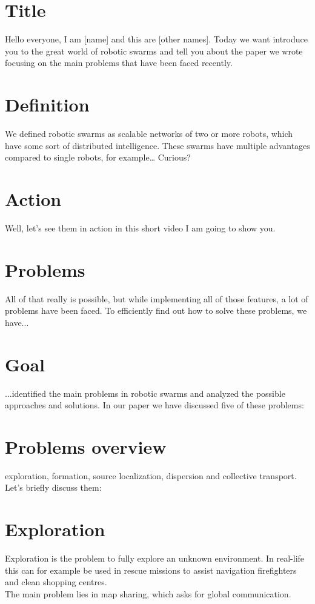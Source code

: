 \documentclass[a4paper]{article}
\begin{document}
\section*{Title}
Hello everyone, I am [name] and this are [other names]. Today we want introduce you to the great world of robotic swarms and tell you about the paper we wrote focusing on the main problems that have been faced recently.

\section*{Definition}
We defined robotic swarms as scalable networks of two or more robots, which have some sort of distributed intelligence. These swarms have multiple advantages compared to single robots, for example… Curious?

\section*{Action}
Well, let’s see them in action in this short video I am going to show you.

\section*{Problems}
All of that really is possible, but while implementing all of those features, a lot of problems have been faced. To efficiently find out how to solve these problems, we have...

\section*{Goal}
...identified the main problems in robotic swarms and analyzed the possible approaches and solutions. In our paper we have discussed five of these problems: 

\section*{Problems overview}
exploration, formation, source localization, dispersion and collective transport. 
Let’s briefly discuss them:

\section*{Exploration}
Exploration is the problem to fully explore an unknown environment. In real-life this can for example be used in rescue missions to assist navigation firefighters and clean shopping centres. \\
The main problem lies in map sharing, which asks for global communication.
\end{document}
